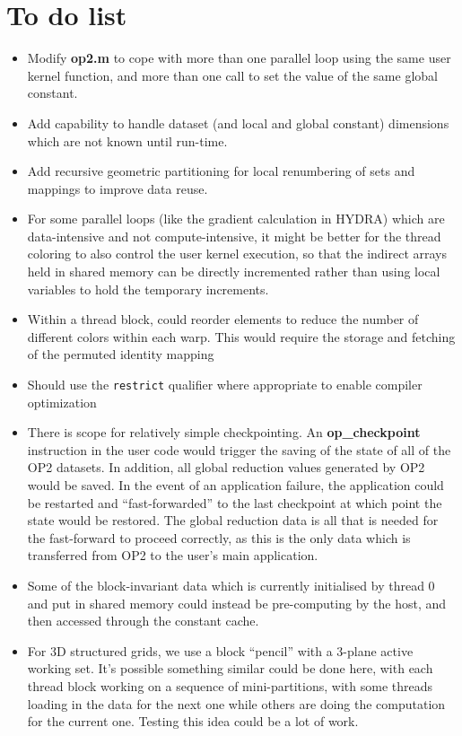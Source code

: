 \documentclass[12pt]{article}
\begin{document}
\newpage

\section{To do list}

\begin{itemize}
\item
Modify {\bf op2.m} to cope with more than one parallel loop using
the same user kernel function, and more than one call to set the
value of the same global constant.

\item
Add capability to handle dataset (and local and global constant) dimensions
which are not known until run-time.

\item
Add recursive geometric partitioning for local renumbering of sets and
mappings to improve data reuse.

\item
For some parallel loops (like the gradient calculation in HYDRA)
which are data-intensive and not compute-intensive, it might be better
for the thread coloring to also control the user kernel execution, so
that the indirect arrays held in shared memory can be directly incremented
rather than using local variables to hold the temporary increments.

\item
Within a thread block, could reorder elements to reduce the number of
different colors within each warp.  This would require the storage and
fetching of the permuted identity mapping

\item
Should use the {\tt restrict} qualifier where appropriate to enable
compiler optimization

\item
There is scope for relatively simple checkpointing. An {\bf op\_checkpoint}
instruction in the user code would trigger the saving of the state of all
of the OP2 datasets.  In addition, all global reduction values generated by
OP2 would be saved.  In the event of an application failure, the application
could be restarted and ``fast-forwarded'' to the last checkpoint at which
point the state would be restored.  The global reduction data is all that is
needed for the fast-forward to proceed correctly, as this is the only data
which is transferred from OP2 to the user's main application.

\item
Some of the block-invariant data which is currently initialised by thread 0
and put in shared memory could instead be pre-computing by the host, and
then accessed through the constant cache.

\item
For 3D structured grids, we use a block ``pencil'' with a 3-plane active
working set.  It's possible something similar could be done here, with each
thread block working on a sequence of mini-partitions, with some threads
loading in the data for the next one while others are doing the computation
for the current one.  Testing this idea could be a lot of work.


\end{itemize}
\end{document}
